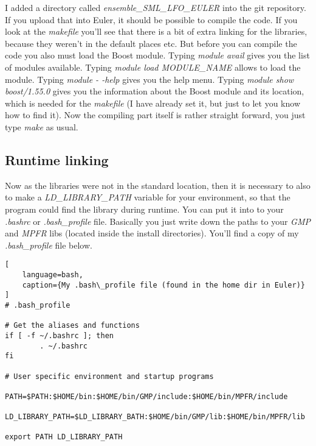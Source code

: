 \documentclass{article}
\begin{document}
I added a directory called \emph{ensemble\_SML\_LFO\_EULER} into the git repository. If you upload that into Euler, it should be possible to compile the code. If you look at the \emph{makefile} you'll see that there is a bit of extra linking for the libraries, because they weren't in the default places etc. But before you can compile the code you also must load the Boost module. Typing \emph{module avail} gives you the list of modules available. Typing \emph{module load MODULE\_NAME} allows to load the module. Typing \emph{module - -help} gives you the help menu. Typing \emph{module show boost/1.55.0} gives you the information about the Boost module and its location, which is needed for the \emph{makefile} (I have already set it, but just to let you know how to find it). Now the compiling part itself is rather straight forward, you just type \emph{make} as usual.  

\subsection{Runtime linking}

Now as the libraries were not in the standard location, then it is necessary to also to make a \emph{LD\_LIBRARY\_PATH} variable for your environment, so that the program could find the library during runtime. You can put it into to your \emph{.bashrc} or \emph{.bash\_profile} file. Basically you just write down the paths to your \emph{GMP} and \emph{MPFR} libs (located inside the install directories). You'll find a copy of my \emph{.bash\_profile} file below.  

\begin{lstlisting}[
	language=bash,
	caption={My .bash\_profile file (found in the home dir in Euler)}
]
# .bash_profile

# Get the aliases and functions
if [ -f ~/.bashrc ]; then
        . ~/.bashrc
fi

# User specific environment and startup programs

PATH=$PATH:$HOME/bin:$HOME/bin/GMP/include:$HOME/bin/MPFR/include

LD_LIBRARY_PATH=$LD_LIBRARY_BATH:$HOME/bin/GMP/lib:$HOME/bin/MPFR/lib

export PATH LD_LIBRARY_PATH

\end{lstlisting}
\end{document}
